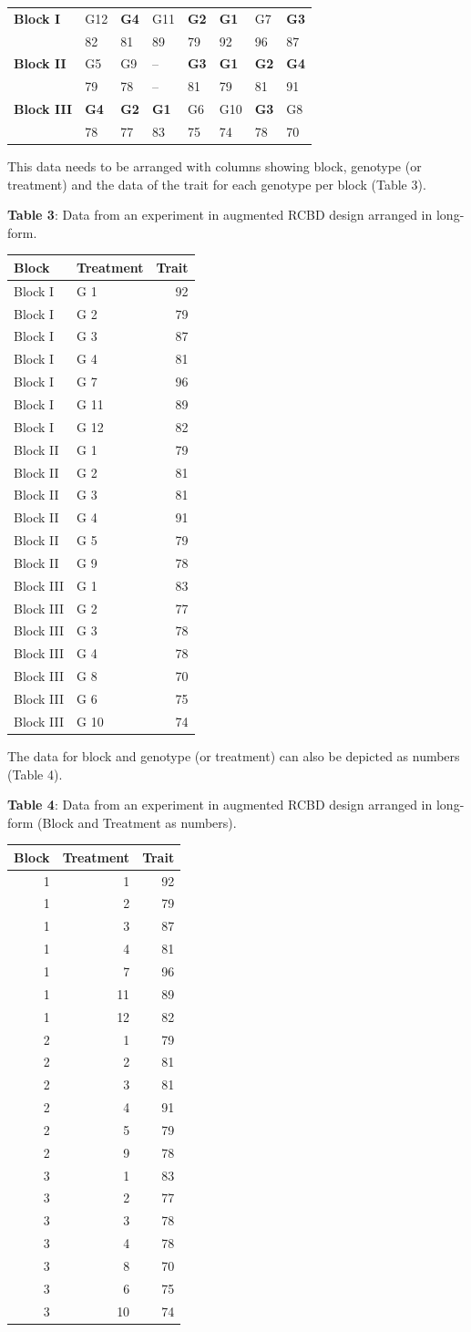 \begin{longtable}[]{@{}llllllll@{}}
\toprule
\endhead
\textbf{Block I} & G12 & \textbf{G4} & G11 & \textbf{G2} & \textbf{G1} &
G7 & \textbf{G3}\tabularnewline
& 82 & 81 & 89 & 79 & 92 & 96 & 87\tabularnewline
\textbf{Block II} & G5 & G9 & -- & \textbf{G3} & \textbf{G1} &
\textbf{G2} & \textbf{G4}\tabularnewline
& 79 & 78 & -- & 81 & 79 & 81 & 91\tabularnewline
\textbf{Block III} & \textbf{G4} & \textbf{G2} & \textbf{G1} & G6 & G10
& \textbf{G3} & G8\tabularnewline
& 78 & 77 & 83 & 75 & 74 & 78 & 70\tabularnewline
\bottomrule
\end{longtable}

This data needs to be arranged with columns showing block, genotype (or
treatment) and the data of the trait for each genotype per block (Table
3).

\begin{center}
                \textbf{Table 3}: Data from an experiment in augmented RCBD design arranged in long-form.
                \end{center}

\begin{longtable}[]{@{}llr@{}}
\toprule
Block & Treatment & Trait\tabularnewline
\midrule
\endhead
Block I & G 1 & 92\tabularnewline
Block I & G 2 & 79\tabularnewline
Block I & G 3 & 87\tabularnewline
Block I & G 4 & 81\tabularnewline
Block I & G 7 & 96\tabularnewline
Block I & G 11 & 89\tabularnewline
Block I & G 12 & 82\tabularnewline
Block II & G 1 & 79\tabularnewline
Block II & G 2 & 81\tabularnewline
Block II & G 3 & 81\tabularnewline
Block II & G 4 & 91\tabularnewline
Block II & G 5 & 79\tabularnewline
Block II & G 9 & 78\tabularnewline
Block III & G 1 & 83\tabularnewline
Block III & G 2 & 77\tabularnewline
Block III & G 3 & 78\tabularnewline
Block III & G 4 & 78\tabularnewline
Block III & G 8 & 70\tabularnewline
Block III & G 6 & 75\tabularnewline
Block III & G 10 & 74\tabularnewline
\bottomrule
\end{longtable}

The data for block and genotype (or treatment) can also be depicted as
numbers (Table 4).

\begin{center}
                \textbf{Table 4}: Data from an experiment in augmented RCBD design arranged in long-form (Block and Treatment as numbers).
                \end{center}

\begin{longtable}[]{@{}rrr@{}}
\toprule
Block & Treatment & Trait\tabularnewline
\midrule
\endhead
1 & 1 & 92\tabularnewline
1 & 2 & 79\tabularnewline
1 & 3 & 87\tabularnewline
1 & 4 & 81\tabularnewline
1 & 7 & 96\tabularnewline
1 & 11 & 89\tabularnewline
1 & 12 & 82\tabularnewline
2 & 1 & 79\tabularnewline
2 & 2 & 81\tabularnewline
2 & 3 & 81\tabularnewline
2 & 4 & 91\tabularnewline
2 & 5 & 79\tabularnewline
2 & 9 & 78\tabularnewline
3 & 1 & 83\tabularnewline
3 & 2 & 77\tabularnewline
3 & 3 & 78\tabularnewline
3 & 4 & 78\tabularnewline
3 & 8 & 70\tabularnewline
3 & 6 & 75\tabularnewline
3 & 10 & 74\tabularnewline
\bottomrule
\end{longtable}

